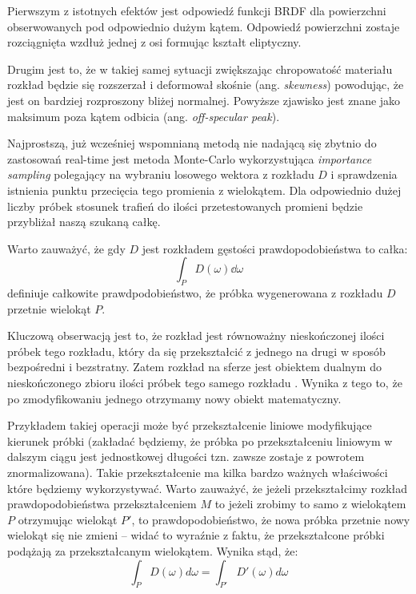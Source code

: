 \documentclass[../main.tex]{subfiles}
\begin{document}
Pierwszym z istotnych efektów jest odpowiedź funkcji BRDF dla powierzchni obserwowanych pod odpowiednio dużym kątem. Odpowiedź powierzchni zostaje rozciągnięta wzdłuż jednej z osi formując kształt eliptyczny.


Drugim jest to, że w takiej samej sytuacji zwiększając chropowatość materiału rozkład będzie się rozszerzał i deformował skośnie (ang. \textit{skewness}) powodując, że jest on bardziej rozproszony bliżej normalnej. Powyższe zjawisko jest znane jako maksimum poza kątem odbicia (ang. \textit{off-specular peak}).


Najprostszą, już wcześniej wspomnianą metodą nie nadającą się zbytnio do
zastosowań real-time jest metoda Monte-Carlo wykorzystująca \textit{importance
sampling} polegający na wybraniu losowego wektora z rozkładu $D$ i sprawdzenia
istnienia punktu przecięcia tego promienia z wielokątem. Dla odpowiednio dużej
liczby próbek stosunek trafień do ilości przetestowanych promieni będzie
przybliżał naszą szukaną całkę.

Warto zauważyć, że gdy $D$ jest rozkładem gęstości prawdopodobieństwa to całka:
\[
\int_P {
    D(\omega)
    \dd \omega
}
\]
\noindent definiuje całkowite prawdpodobieństwo, że próbka wygenerowana z rozkładu $D$
przetnie wielokąt $P$.

Kluczową obserwacją jest to, że rozkład jest równoważny nieskończonej ilości próbek tego rozkładu, który da się przekształcić z jednego na drugi w sposób bezpośredni i bezstratny. Zatem rozkład na sferze jest obiektem dualnym do nieskończonego zbioru ilości próbek tego samego rozkładu \cite{ltc_heitz}. Wynika z tego to, że po zmodyfikowaniu jednego otrzymamy nowy obiekt matematyczny.

Przykładem takiej operacji może być przekształcenie liniowe modyfikujące
kierunek próbki (zakładać będziemy, że próbka po przekształceniu liniowym w
dalszym ciągu jest jednostkowej długości tzn. zawsze zostaje z powrotem
znormalizowana). Takie przekształcenie ma kilka bardzo ważnych właściwości
które będziemy wykorzystywać. Warto zauważyć, że jeżeli przekształcimy rozkład
prawdopodobieństwa przekształceniem $M$ to jeżeli zrobimy to samo z wielokątem
$P$ otrzymując wielokąt $P'$, to prawdopodobieństwo, że nowa próbka przetnie
nowy wielokąt się nie zmieni – widać to wyraźnie z faktu, że przekształcone
próbki podążają za przekształcanym wielokątem. Wynika stąd, że:
\[
\int_P {
  D(\omega)
  d \omega
} = \int_{P'} {
  D'(\omega)
  d\omega
}
\]
\end{document}
